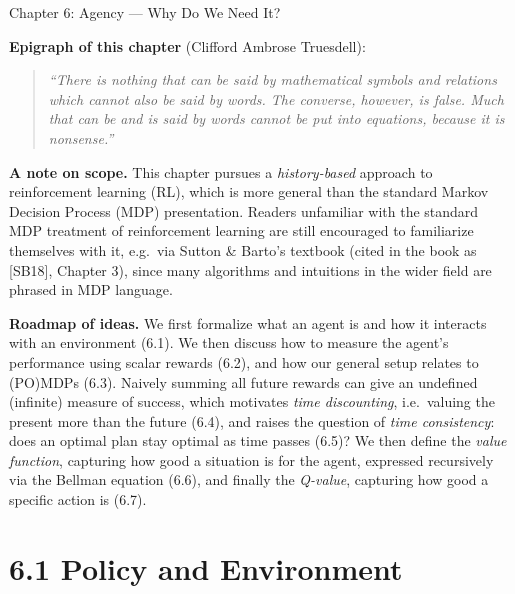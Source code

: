 \documentclass[aspectratio=169,10pt]{beamer}
\begin{document}
\begin{frame}[allowframebreaks]{Chapter 6: Agency --- Why Do We Need It?}
\framebreak

\textbf{Epigraph of this chapter} (Clifford Ambrose Truesdell):
\begin{quote}
\itshape ``There is nothing that can be said by mathematical symbols and
relations which cannot also be said by words. The converse, however, is
false. Much that can be and is said by words cannot be put into equations,
because it is nonsense.''
\end{quote}

\vspace{0.3cm}
\textbf{A note on scope.} This chapter pursues a \emph{history-based}
approach to reinforcement learning (RL), which is more general than the
standard Markov Decision Process (MDP) presentation. Readers unfamiliar with
the standard MDP treatment of reinforcement learning are still encouraged to
familiarize themselves with it, e.g.\ via Sutton \& Barto's textbook
(cited in the book as [SB18], Chapter 3), since many algorithms and
intuitions in the wider field are phrased in MDP language.

\vspace{0.3cm}
\textbf{Roadmap of ideas.} We first formalize what an agent is and how it
interacts with an environment (6.1). We then discuss how to measure the
agent's performance using scalar rewards (6.2), and how our general setup
relates to (PO)MDPs (6.3). Naively summing all future rewards can give an
undefined (infinite) measure of success, which motivates \emph{time
discounting}, i.e.\ valuing the present more than the future (6.4), and
raises the question of \emph{time consistency}: does an optimal plan stay
optimal as time passes (6.5)? We then define the \emph{value function},
capturing how good a situation is for the agent, expressed recursively via
the Bellman equation (6.6), and finally the \emph{Q-value}, capturing how
good a specific action is (6.7).
\end{frame}

\section{6.1 Policy and Environment}
\end{document}
